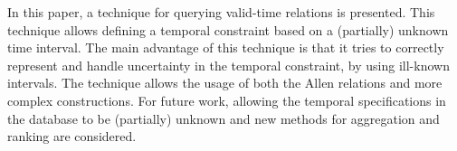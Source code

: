 In this paper, a technique for querying valid-time relations is presented. This technique allows defining a temporal constraint based on a (partially) unknown time interval. The main advantage of this technique is that it tries to correctly represent and handle uncertainty in the temporal constraint, by using ill-known intervals. The technique allows the usage of both the Allen relations and more complex constructions. For future work, allowing the temporal specifications in the database to be (partially) unknown and new methods for aggregation and ranking are considered.


